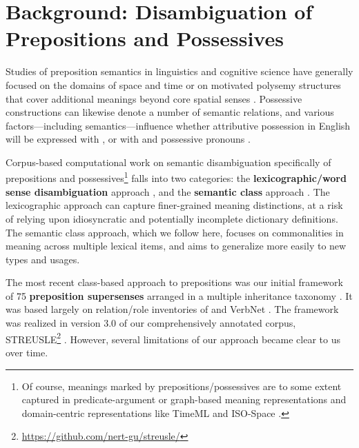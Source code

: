 \pdfoutput=1 \documentclass[11pt,a4paper]{article}
\begin{document}
\section{Background: Disambiguation of Prepositions and Possessives}\label{sec:background}


Studies of preposition semantics in linguistics and cognitive science have generally focused on the domains of space and time \citep[e.g.,][]{herskovits-86,bowerman-01,regier-96,khetarpal-09,xu-10,zwarts-00} or on motivated polysemy structures that cover additional meanings beyond core spatial senses \citep{brugman-81,lakoff-87,tyler-03,lindstromberg-10}.
Possessive constructions can likewise denote a number of semantic relations, and various factors---including semantics---influence whether attributive possession in English will be expressed with , or with  and possessive pronouns \citep[the `genitive alternation';][]{taylor-96,nikiforidou-91,rosenbach-02,heine-06,wolk-13,shih-15}.

Corpus-based computational work on semantic disambiguation specifically of prepositions and possessives\footnote{Of course, meanings marked by prepositions\slash possessives are to some extent captured in predicate-argument or graph-based meaning representations \citep[e.g.,][]{palmer-05,framenet,oepen-16,amr} and domain-centric representations like TimeML and \mbox{ISO-Space} \citep{timeml,isospace}.} falls into two categories: 
the \textbf{lexicographic\slash word sense disambiguation} approach \citep{litkowski-05,litkowski-07,litkowski-14,ye-07,prepnet,dahlmeier-09,tratz-09,hovy-10,hovy-11,tratz-13},
and the \textbf{semantic class} approach \citep[see also \citealp{muller-12} for German]{moldovan-04,badulescu-09,ohara-09,srikumar-11,srikumar-13,schneider-15,schneider-16,hwang-17}.
The lexicographic approach can capture finer-grained meaning distinctions, at a risk of relying upon idiosyncratic and potentially incomplete dictionary definitions. 
The semantic class approach, which we follow here, focuses on commonalities in meaning across multiple lexical items, and aims to generalize more easily to new types and usages.

The most recent class-based approach to prepositions was our initial framework of 75 \textbf{preposition supersenses} arranged in a multiple inheritance taxonomy \citep{schneider-15,schneider-16}. It was based largely on relation\slash role inventories of \citet{srikumar-13} and VerbNet \citep{bonial-11,palmer-17}.
The framework was realized in version 3.0 of our comprehensively annotated corpus, STREUSLE\footnote{\label{fn:streusle}\url{https://github.com/nert-gu/streusle/}}
\citep{schneider-16}.
However, several limitations of our approach became clear to us over time.
\end{document}
